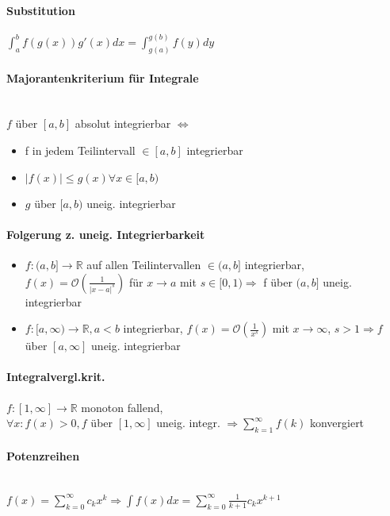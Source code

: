 \documentclass[paper=a3,paper=landscape, fontsize=9pt, DIV=30]{scrartcl}
\newcommand{\real}{{\mathbb{R}}}
\newcommand{\laO}{\mathcal{O}}
\begin{document}
\begin{multicols*}{4}
  \paragraph{Substitution}
  $\int_{a}^{b}f(g(x))g'(x)dx=\int_{g(a)}^{g(b)}f(y)dy$


  \paragraph{Majorantenkriterium für Integrale}\hspace{0pt} \\
  $f$ über $[a,b]$ absolut integrierbar $\Leftrightarrow$
  \begin{itemize}
  \item f in jedem Teilintervall $\in [a,b]$ integrierbar
  \item $\lvert f(x) \rvert \leq g(x) \forall x \in [a,b)$
  \item $g$ über $[a,b)$ uneig. integrierbar
  \end{itemize}

	\paragraph{Folgerung z. uneig. Integrierbarkeit}
	\begin{itemize}
		\item $f: (a,b] \rightarrow \real$ auf allen Teilintervallen $\in (a,b]$ integrierbar, $f(x)=\laO(\frac{1}{\lvert x-a \rvert ^s})$ für $x \rightarrow a$ mit $s \in [0,1) \Rightarrow$ f über $(a,b]$ uneig. integrierbar
		\item $f: [a,\infty) \rightarrow \real, a<b$ integrierbar, $f(x)=\laO(\frac{1}{x^s})$ mit $x \rightarrow \infty$, $s > 1 \Rightarrow f$ über $[a,\infty]$ uneig. integrierbar
	\end{itemize}


  \paragraph{Integralvergl.krit.}
  $f:[1,\infty]\rightarrow\real$ monoton fallend,\\$\forall x: f(x)>0, f$ über $[1,\infty]$ uneig. integr. $\Rightarrow \sum_{k=1}^{\infty}f(k)$ konvergiert


  \paragraph{Potenzreihen}\hspace{0pt} \\
  $f(x)=\sum_{k=0}^{\infty}c_kx^k \Rightarrow \int f(x)dx=\sum_{k=0}^{\infty}\frac{1}{k+1}c_kx^{k+1}$




\end{multicols*}
\end{document}
